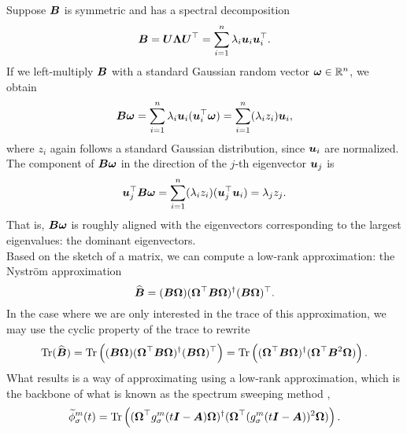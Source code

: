 Suppose $\boldsymbol{B}$ is symmetric and has a spectral decomposition
\begin{equation}
    \boldsymbol{B}
        = \boldsymbol{U} \boldsymbol{\Lambda} \boldsymbol{U}^{\top} 
        = \sum_{i=1}^n \lambda_i \boldsymbol{u}_i \boldsymbol{u}_i^{\top}.
    \label{equ:3-nystrom-sketching-spectral-decomposition}
\end{equation}
If we left-multiply $\boldsymbol{B}$ with a standard Gaussian random vector $\boldsymbol{\omega} \in \mathbb{R}^n$,
we obtain
\begin{equation}
    \boldsymbol{B}\boldsymbol{\omega}
        = \sum_{i=1}^n \lambda_i \boldsymbol{u}_i (\boldsymbol{u}_i^{\top} \boldsymbol{\omega})
        = \sum_{i=1}^n (\lambda_i  z_i) \boldsymbol{u}_i,
        \label{equ:3-nystrom-sketching-random-multiplication}
\end{equation}
where $z_i$ again follows a standard Gaussian distribution, since $\boldsymbol{u}_i$ are
normalized. The component of $\boldsymbol{B}\boldsymbol{\omega}$ in the direction of the
$j$-th eigenvector $\boldsymbol{u}_j$ is
\begin{equation}
    \boldsymbol{u}_j^{\top}\boldsymbol{B}\boldsymbol{\omega}
        = \sum_{i=1}^n (\lambda_i  z_i) (\boldsymbol{u}_j^{\top} \boldsymbol{u}_i)
        = \lambda_j  z_j.
        \label{equ:3-nystrom-sketching-dominant-component}
\end{equation}
That is, $\boldsymbol{B}\boldsymbol{\omega}$ is roughly aligned with the eigenvectors corresponding
to the largest eigenvalues: the dominant eigenvectors.\\

Based on the sketch of a matrix, we can compute a low-rank approximation:
the Nyström approximation \cite{gittens2013nystrom,lin2017randomized}
\begin{equation}
    \widehat{\boldsymbol{B}} = (\boldsymbol{B} \boldsymbol{\Omega}) (\boldsymbol{\Omega}^{\top} \boldsymbol{B} \boldsymbol{\Omega})^{\dagger} (\boldsymbol{B} \boldsymbol{\Omega})^{\top}.
    \label{equ:3-nystrom-nystrom}
\end{equation}
In the case where we are only interested in the trace of this approximation,
we may use the cyclic property of the trace to rewrite
\begin{equation}
    \operatorname{Tr}(\widehat{\boldsymbol{B}})
        = \operatorname{Tr}\left((\boldsymbol{B} \boldsymbol{\Omega}) (\boldsymbol{\Omega}^{\top} \boldsymbol{B} \boldsymbol{\Omega})^{\dagger} (\boldsymbol{B} \boldsymbol{\Omega})^{\top} \right)
        = \operatorname{Tr}\left((\boldsymbol{\Omega}^{\top} \boldsymbol{B} \boldsymbol{\Omega})^{\dagger} (\boldsymbol{\Omega}^{\top} \boldsymbol{B}^2 \boldsymbol{\Omega}) \right).
    \label{equ:3-nystrom-nystrom-trace}
\end{equation}
What results is a way of approximating 
using a low-rank approximation, which is the backbone of what is known
as the spectrum sweeping method \cite{lin2017randomized},
\begin{equation}
    \widetilde{\phi}_{\sigma}^m(t)
        = \operatorname{Tr}\left((\boldsymbol{\Omega}^{\top} g_{\sigma}^m(t\boldsymbol{I} - \boldsymbol{A}) \boldsymbol{\Omega})^{\dagger} (\boldsymbol{\Omega}^{\top} (g_{\sigma}^m(t\boldsymbol{I} - \boldsymbol{A}))^2 \boldsymbol{\Omega})\right).
    \label{equ:3-nystrom-spectral-density}
\end{equation}\\

